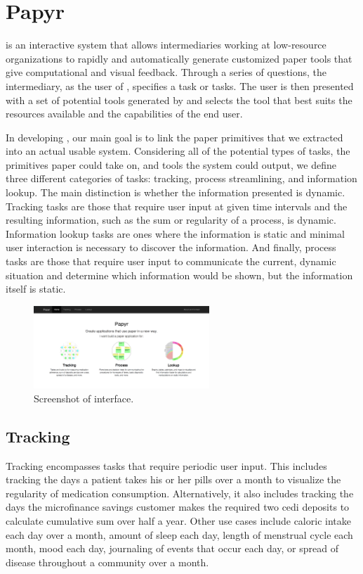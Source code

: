 \documentclass{sig-alternate}
\begin{document}
\section{Papyr}
\label{sec:system-desc}

\nifty is an interactive system that allows intermediaries working at low-resource organizations to rapidly and automatically generate customized paper tools that give computational and visual feedback. Through a series of questions, the intermediary, as the user of \nifty, specifies a task or tasks. The user is then presented with a set of potential tools generated by \nifty and selects the tool that best suits the resources available and the capabilities of the end user. 

In developing \nifty, our main goal is to link the paper primitives that we extracted into an actual usable system. Considering all of the potential types of tasks, the primitives paper could take on, and tools the system could output, we define three different categories of tasks: tracking, process streamlining, and information lookup. The main distinction is whether the information presented is dynamic. Tracking tasks are those that require user input at given time intervals and the resulting information, such as the sum or regularity of a process, is dynamic. Information lookup tasks are ones where the information is static and minimal user interaction is necessary to discover the information. And finally, process tasks are those that require user input to communicate the current, dynamic situation and determine which information would be shown, but the information itself is static.

\begin{figure}
\centering
\includegraphics[width=250px]{img/home-screen.png}
\caption{Screenshot of \nifty interface.}
\label{fig:home}
\end{figure}

\subsection{Tracking}

Tracking encompasses tasks that require periodic user input. This includes tracking the days a patient takes his or her pills over a month to visualize the regularity of medication consumption. Alternatively, it also includes tracking the days the microfinance savings customer makes the required two cedi deposits to calculate cumulative sum over half a year. Other use cases include caloric intake each day over a month, amount of sleep each day, length of menstrual cycle each month, mood each day, journaling of events that occur each day, or spread of disease throughout a community over a month.
\end{document}
